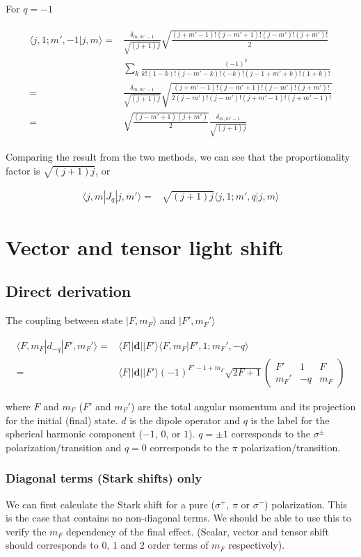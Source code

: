 \documentclass[10pt,fleqn]{article}
\newcommand{\eqar}[1]
{
  \begin{align}
    #1
  \end{align}
}
\begin{document}
For $q=-1$
\eqar{
  \begin{split}
    \langle j,1;m',-1|j,m\rangle=&\frac{\delta_{m,m'-1}}{\sqrt{(j+1)j}}\sqrt{\frac{(j+m'-1)!(j-m'+1)!(j-m')!(j+m')!}{2}}\\
                                 &\sum_k\frac{(-1)^k}{k!(1-k)!(j-m'-k)!(-k)!(j-1+m'+k)!(1+k)!}\\
    =&\frac{\delta_{m,m'-1}}{\sqrt{(j+1)j}}\sqrt{\frac{(j+m'-1)!(j-m'+1)!(j-m')!(j+m')!}{2(j-m')!(j-m')!(j+m'-1)!(j+m'-1)!}}\\
    =&\sqrt{\frac{(j-m'+1)(j+m')}{2}}\frac{\delta_{m,m'-1}}{\sqrt{(j+1)j}}
  \end{split}
}
Comparing the result from the two methods,
we can see that the proportionality factor is $\sqrt{(j+1)j}$, or
\eqar{
  \langle j,m|J_q|j,m'\rangle=&\sqrt{(j+1)j}\langle j,1;m',q|j,m\rangle
}


\section{Vector and tensor light shift}

\subsection{Direct derivation}
The coupling between state $|F,m_F\rangle$ and $|F',m_F'\rangle$
\eqar{
  \langle F,m_F|d_{-q}|F',m_F'\rangle=&\langle F||\mathbf{d}||F'\rangle\langle F,m_F|F',1;m_F',-q\rangle\\
  =&\langle F||\mathbf{d}||F'\rangle (-1)^{F'-1+m_F}\sqrt{2F+1}
  \begin{pmatrix}
    F'&1&F\\
    m_F'&-q&m_F
  \end{pmatrix}
}
where $F$ and $m_F$ ($F'$ and $m_F'$) are the total angular momentum and its projection
for the initial (final) state. $d$ is the dipole operator and $q$ is the label
for the spherical harmonic component ($-1$, $0$, or $1$).
$q=\pm1$ corresponds to the $\sigma^\pm$ polarization/transition
and $q=0$ corresponds to the $\pi$ polarization/transition.\\

\subsubsection{Diagonal terms (Stark shifts) only}\label{stark-shift-explicit}
We can first calculate the Stark shift for a pure
($\sigma^+$, $\pi$ or $\sigma^-$) polarization.
This is the case that contains no non-diagonal terms.
We should be able to use this to verify the $m_F$ dependency of the final effect.
(Scalar, vector and tensor shift should corresponds to $0$, $1$ and $2$ order terms
of $m_F$ respectively).\\
\end{document}
